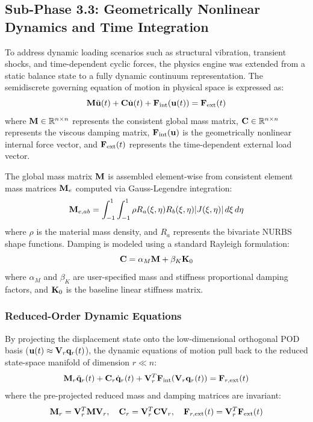\subsection{Sub-Phase 3.3: Geometrically Nonlinear Dynamics and Time Integration}
\label{subsec:dynamics_time}

To address dynamic loading scenarios such as structural vibration, transient shocks, and time-dependent cyclic forces, the physics engine was extended from a static balance state to a fully dynamic continuum representation. The semidiscrete governing equation of motion in physical space is expressed as:
\begin{equation}
        \mathbf{M} \ddot{\mathbf{u}}(t) + \mathbf{C} \dot{\mathbf{u}}(t) + \mathbf{F}_{\text{int}}(\mathbf{u}(t)) = \mathbf{F}_{\text{ext}}(t)
\end{equation}
where $\mathbf{M} \in \mathbb{R}^{n \times n}$ represents the consistent global mass matrix, $\mathbf{C} \in \mathbb{R}^{n \times n}$ represents the viscous damping matrix, $\mathbf{F}_{\text{int}}(\mathbf{u})$ is the geometrically nonlinear internal force vector, and $\mathbf{F}_{\text{ext}}(t)$ represents the time-dependent external load vector.

The global mass matrix $\mathbf{M}$ is assembled element-wise from consistent element mass matrices $\mathbf{M}_e$ computed via Gauss-Legendre integration:
\begin{equation}
        \mathbf{M}_{e, ab} = \int_{-1}^{1} \int_{-1}^{1} \rho R_a(\xi, \eta) R_b(\xi, \eta) |J(\xi, \eta)| \, d\xi \, d\eta
\end{equation}
where $\rho$ is the material mass density, and $R_a$ represents the bivariate NURBS shape functions. Damping is modeled using a standard Rayleigh formulation:
\begin{equation}
        \mathbf{C} = \alpha_M \mathbf{M} + \beta_K \mathbf{K}_0
\end{equation}
where $\alpha_M$ and $\beta_K$ are user-specified mass and stiffness proportional damping factors, and $\mathbf{K}_0$ is the baseline linear stiffness matrix.

\subsubsection{Reduced-Order Dynamic Equations}
By projecting the displacement state onto the low-dimensional orthogonal POD basis ($\mathbf{u}(t) \approx \mathbf{V}_r \mathbf{q}_r(t)$), the dynamic equations of motion pull back to the reduced state-space manifold of dimension $r \ll n$:
\begin{equation}
        \mathbf{M}_r \ddot{\mathbf{q}}_r(t) + \mathbf{C}_r \dot{\mathbf{q}}_r(t) + \mathbf{V}_r^T \mathbf{F}_{\text{int}}(\mathbf{V}_r \mathbf{q}_r(t)) = \mathbf{F}_{r,\text{ext}}(t)
\end{equation}
where the pre-projected reduced mass and damping matrices are invariant:
\begin{equation}
        \mathbf{M}_r = \mathbf{V}_r^T \mathbf{M} \mathbf{V}_r, \quad \mathbf{C}_r = \mathbf{V}_r^T \mathbf{C} \mathbf{V}_r, \quad \mathbf{F}_{r,\text{ext}}(t) = \mathbf{V}_r^T \mathbf{F}_{\text{ext}}(t)
\end{equation}

